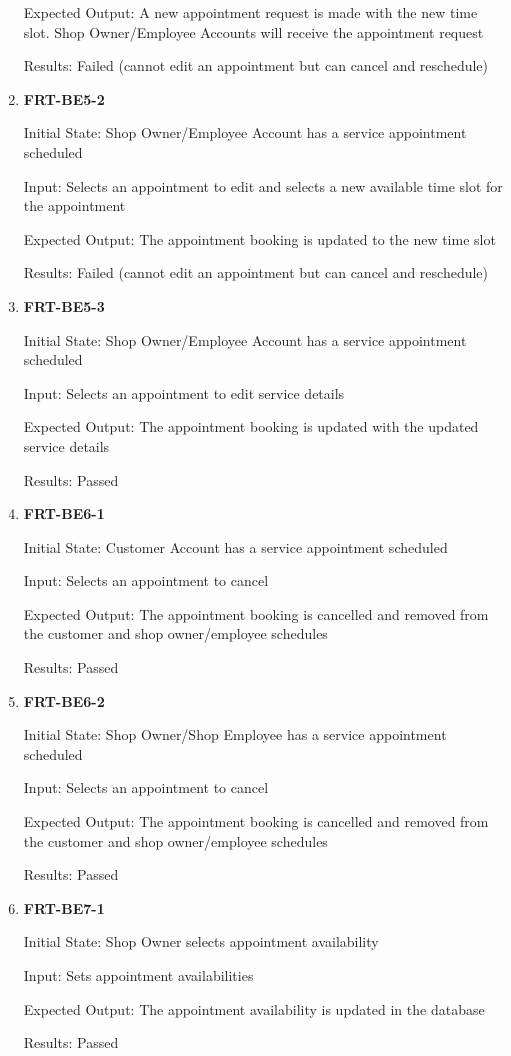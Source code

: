 \documentclass[12pt, titlepage]{article}
\begin{document}
\begin{enumerate}
	      Expected Output: A new appointment request is made with the new time slot. Shop Owner/Employee
	      Accounts will receive the appointment request

	      Results: Failed (cannot edit an appointment but can cancel and reschedule)

	\item \textbf{FRT-BE5-2}

	      Initial State: Shop Owner/Employee Account has a service appointment scheduled

	      Input: Selects an appointment to edit and selects a new available time slot for the appointment

	      Expected Output: The appointment booking is updated to the new time slot

	      Results: Failed (cannot edit an appointment but can cancel and reschedule)

	\item \textbf{FRT-BE5-3}

	      Initial State: Shop Owner/Employee Account has a service appointment scheduled

	      Input: Selects an appointment to edit service details

	      Expected Output: The appointment booking is updated with the updated service details

	      Results: Passed

	\item \textbf{FRT-BE6-1}

	      Initial State: Customer Account has a service appointment scheduled

	      Input: Selects an appointment to cancel

	      Expected Output: The appointment booking is cancelled and removed from the customer and shop
	      owner/employee schedules

	      Results: Passed

	\item \textbf{FRT-BE6-2}

	      Initial State: Shop Owner/Shop Employee has a service appointment scheduled

	      Input: Selects an appointment to cancel

	      Expected Output: The appointment booking is cancelled and removed from the customer and shop
	      owner/employee schedules

	      Results: Passed

	\item \textbf{FRT-BE7-1}

	      Initial State: Shop Owner selects appointment availability

	      Input: Sets appointment availabilities

	      Expected Output: The appointment availability is updated in the database

	      Results: Passed

\end{enumerate}
\end{document}
